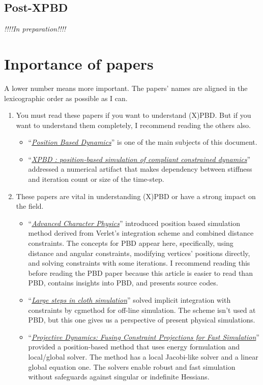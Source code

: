 \documentclass[pdflatex,sn-mathphys-num]{sn-jnl}%
\theoremstyle{thmstyleone}%
\theoremstyle{thmstyletwo}%
\theoremstyle{thmstylethree}%
\newcommand{\pname}[1]{``{\uline{\sl {#1}}}''}
\newcommand{\inprep}{
	\begin{center}
		\sl\rm {!!!!In preparation!!!!}
\end{center}}
\begin{document}
\subsection{Post-XPBD}
\inprep
\newpage
\appendix




\section{Inportance of papers}
A lower number means more important. The papers' names are aligned in the lexicographic order as possible as I can.
\begin{enumerate}
	\item You must read these papers if you want to understand (X)PBD. But if you want to understand them completely, I recommend reading the others also.
		\begin{itemize}
			\item \pname{Position Based Dynamics}\cite{PBD} is one of the main subjects of this document.
			\newline
			\item \pname{XPBD : position-based simulation of compliant constrained dynamics}\cite{XPBD} addressed a numerical artifact that makes dependency between stiffness and \gls{iteration} count or size of the time-step.
		\end{itemize}
		\item  These papers are vital in understanding (X)PBD or have a strong impact on the field.
		\begin{itemize}
			\item\pname{Advanced Character Physics}\cite{Jakobsen2003AdvancedCP} introduced position based simulation method derived from Verlet's integration scheme and combined distance constraints. The concepts for PBD appear here, specifically, using distance and angular constraints, modifying vertices' positions directly, and solving \gls{constraint}s with some iterations. I recommend reading this before reading the PBD paper because this article is easier to read than PBD, contains insights into PBD, and presents source codes.
			\newline
			\item \pname{Large steps in cloth simulation}\cite{LargeStepBaraff} solved implicit integration with \gls{constraint}s by \gls{cgmethod} for off-line simulation. The scheme isn't used at PBD, but this one gives us a perspective of present physical simulations.
			\newline
			\item \pname{Projective Dynamics: Fusing Constraint Projections for Fast Simulation}\cite{ProjDyn} provided a position-based method that uses energy formulation and local/global solver. The method has a local Jacobi-like solver and a linear global equation one. The solvers enable robust and fast simulation without safeguards against singular or indefinite Hessians.

\end{itemize}
\end{enumerate}
\end{document}
